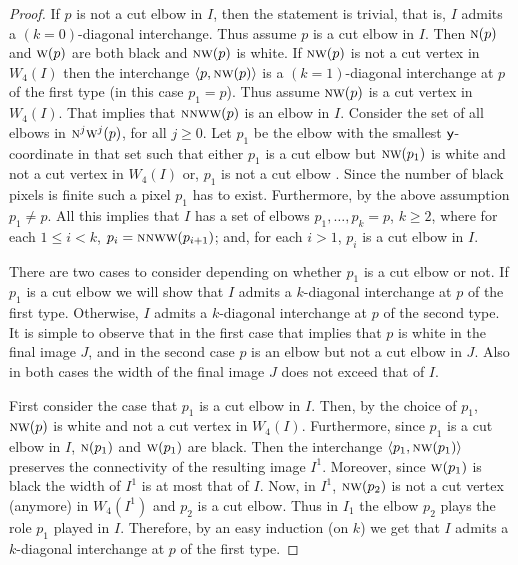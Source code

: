 \documentclass[lotsofwhite,charterfonts]{patmorin}
\newcommand{\N}{\textsc{n}}
\newcommand{\W}{\textsc{w}}
\newcommand{\NW}{\textsc{nw}}
\newcommand{\y}{\ensuremath{\protect\textup{\textsf{y}}}}
\newcommand{\ic}[2]{\langle #1,#2 \rangle}
\begin{document}
\begin{proof}
If $p$ is not a cut elbow in $I$, then the statement is trivial, that
is, $I$ admits a $(k=0)$-diagonal interchange. Thus assume $p$ is a
cut elbow in $I$. Then $\N(p)$ and $\W(p)$ are both black and $\NW(p)$
is white. If $\NW(p)$ is not a cut vertex in $W_4(I)$ then the
interchange $\ic{p}{\NW(p)}$ is a $(k=1)$-diagonal interchange at $p$
of the first type (in this case $p_1=p$). Thus assume $\NW(p)$ is a
cut vertex in $W_4(I)$. That implies that $\N\NW\W(p)$ is an elbow in
$I$. Consider the set of all elbows in $\N^j\W^j(p)$, for all $j\geq
0$. Let $p_1$ be the elbow with the smallest \y-coordinate in that set
such that either $p_1$ is a cut elbow but $\NW(p_1)$ is white and not
a cut vertex in $W_4(I)$ or, $p_1$ is not a cut elbow . Since the
number of black pixels is finite such a pixel $p_1$ has to exist.
Furthermore, by the above assumption $p_1\not=p$. All this implies
that $I$ has a set of elbows $p_1,\dots, p_k=p$, $k\geq 2$, where for
each $1\leq i< k$, $p_i=\N\N\W\W(p_{i+1})$; and, for each $i>1$, $p_i$
is a cut elbow in $I$. 

There are two cases to consider depending on whether $p_1$ is a cut
elbow or not. If $p_1$ is a cut elbow we will show that $I$ admits a
$k$-diagonal interchange at $p$ of the first type. Otherwise, $I$
admits a $k$-diagonal interchange at $p$ of the second type. It is
simple to observe that in the first case that implies that $p$ is
white in the final image $J$, and in the second case $p$ is an elbow
but not a cut elbow in $J$. Also in both cases the width of the final
image $J$ does not exceed that of $I$.

First consider the case that $p_1$ is a cut elbow in $I$. Then, by the
choice of $p_1$, $\NW(p)$ is white and not a cut vertex in $W_4(I)$.
Furthermore, since $p_1$ is a cut elbow in $I$, $\N(p_1)$ and
$\W(p_1)$ are black. Then the interchange $\ic{p_1}{\NW(p_1)}$
preserves the connectivity of the resulting image $I^1$. Moreover,
since $\W(p_1)$ is black the width of $I^1$ is at most that of $I$.
Now, in $I^1$, $\NW(p_2)$ is not a cut vertex (anymore) in $W_4(I^1)$
and $p_2$ is a cut elbow. Thus in $I_1$ the elbow $p_2$ plays the role
$p_1$ played in $I$. Therefore, by an easy induction (on $k$) we get
that $I$ admits a $k$-diagonal interchange at $p$ of the first type. 


\end{proof}
\end{document}
